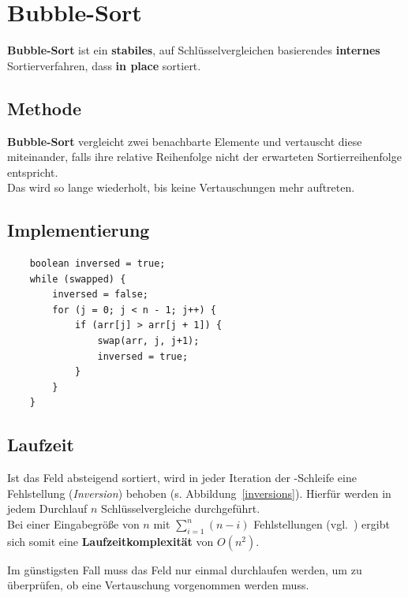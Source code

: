 \section{Bubble-Sort}

\textbf{Bubble-Sort} ist ein \textbf{stabiles}, auf Schlüsselvergleichen basierendes \textbf{internes} Sortierverfahren, dass \textbf{in place} sortiert.

\subsection{Methode}
\textbf{Bubble-Sort} vergleicht zwei benachbarte Elemente und vertauscht diese miteinander, falls ihre relative Reihenfolge nicht der erwarteten Sortierreihenfolge entspricht.\\
Das wird so lange wiederholt, bis keine Vertauschungen mehr auftreten.\\

\subsection{Implementierung}

\begin{verbatim}
    boolean inversed = true;
    while (swapped) {
        inversed = false;
        for (j = 0; j < n - 1; j++) {
            if (arr[j] > arr[j + 1]) {
                swap(arr, j, j+1);
                inversed = true;
            }
        }
    }
\end{verbatim}

\subsection{Laufzeit}
Ist das Feld absteigend sortiert, wird in jeder Iteration der -Schleife eine Fehlstellung (\textit{Inversion}) behoben (s. Abbildung~\ref{inversions}).
Hierfür werden in jedem Durchlauf $n$ Schlüsselvergleiche durchgeführt.\\
Bei einer Eingabegröße von $n$ mit $\sum_{i=1}^n (n-i)$  Fehlstellungen (vgl.~\cite[87]{OW17b}) ergibt sich somit eine \textbf{Laufzeitkomplexität} von $O(n^2)$.

\noindent
Im günstigsten Fall muss das Feld nur einmal durchlaufen werden, um zu überprüfen, ob eine Vertauschung vorgenommen werden muss.\\


